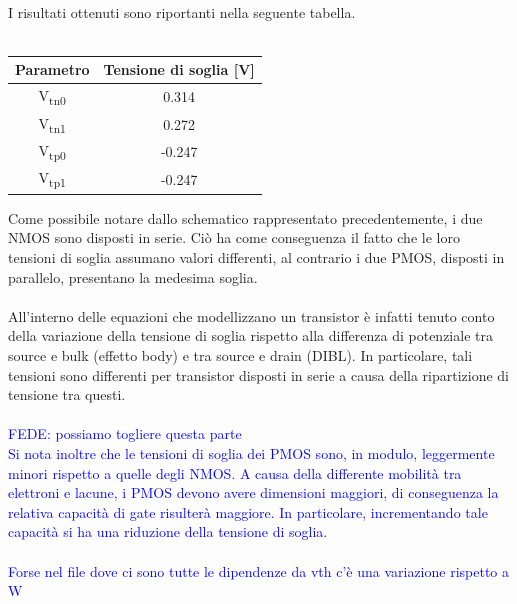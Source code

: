 \documentclass[11pt,  english, makeidx, a4paper, titlepage, oneside]{book}
\begin{document}
\\
I risultati ottenuti sono riportanti nella seguente tabella.
\\\\
\begin{center}
	\begin{tabular}{|c|c|}
	\hline
	Parametro & Tensione di soglia [V] \\
	\hline
	 V\textsubscript{tn0} & 0.314\\
	\hline
	 V\textsubscript{tn1} & 0.272 \\
	\hline
	V\textsubscript{tp0} & -0.247 \\
	\hline
	V\textsubscript{tp1} & -0.247 \\
	\hline
	\end{tabular}	
\end{center}
\vspace{0.3cm}
Come possibile notare dallo schematico rappresentato precedentemente, i due NMOS sono disposti in serie. Ciò ha come conseguenza il fatto che le loro tensioni di soglia assumano valori differenti, al contrario i due PMOS, disposti in parallelo, presentano la medesima soglia.
\\\\
All'interno delle equazioni che modellizzano un transistor è infatti tenuto conto della variazione della tensione di soglia rispetto alla differenza di potenziale tra source e bulk (effetto body) e tra source e drain (DIBL). In particolare, tali tensioni sono differenti per transistor disposti in serie a causa della ripartizione di tensione tra questi.
\\\\
\textcolor{blue}{FEDE: possiamo togliere questa parte \\Si nota inoltre che le tensioni di soglia dei PMOS sono, in modulo, leggermente minori rispetto a quelle degli NMOS. A causa della differente mobilità tra elettroni e lacune, i PMOS devono avere dimensioni maggiori, di conseguenza la relativa capacità di gate risulterà maggiore. In particolare, incrementando tale capacità si ha una riduzione della tensione di soglia.
\\\\
Forse nel file dove ci sono tutte le dipendenze da vth c'è una variazione rispetto a W}
\\\\
\end{document}
